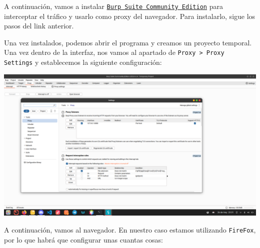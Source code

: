 A continuación, vamos a instalar \href{https://portswigger.net/burp/communitydownload}{\texttt{Burp Suite Community Edition}} para interceptar el tráfico y usarlo como proxy del navegador. Para instalarlo, sigue los pasos del link anterior.

Una vez instalados, podemos abrir el programa y creamos un proyecto temporal. Una vez dentro de la interfaz, nos vamos al apartado de \texttt{Proxy > Proxy Settings} y establecemos la siguiente configuración:

\begin{center}
    \includegraphics[scale=0.18]{imagenes/Captura desde 2024-05-26 23-31-47.png}
\end{center}

A continuación, vamos al navegador. En nuestro caso estamos utilizando \texttt{FireFox}, por lo que habrá que configurar unas cuantas cosas:

